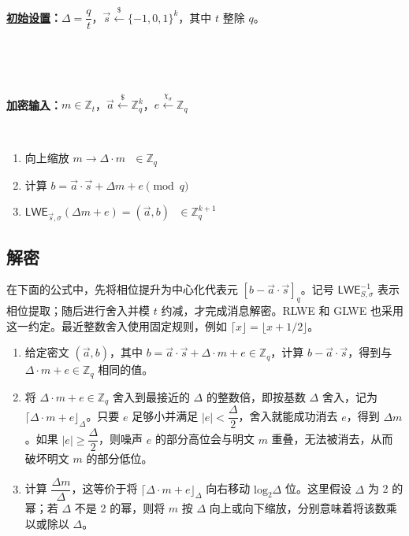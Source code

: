 \begin{tcolorbox}[title={\textbf{\tboxlabel{\ref*{subsec:lwe-enc}} LWE 加密}}]
\textbf{\underline{初始设置}：}$\Delta = \dfrac{q}{t}$，$\vec{s} \xleftarrow{\$} \{-1, 0, 1\}^k$，其中 $t$ 整除 $q$。

$ $

$ $

\textbf{\underline{加密输入}：}$m \in \mathbb{Z}_t$，$\vec{a} \xleftarrow{\$} \mathbb{Z}_q^k$，$e \xleftarrow{\chi_\sigma} \mathbb{Z}_q$

$ $


\begin{enumerate}
\item 向上缩放 $m \longrightarrow \Delta \cdot m \text{ } \in \mathbb{Z}_q$

\item 计算 $b = \vec{a} \cdot \vec{s} + \Delta  m + e \pmod q$
\item $\textsf{LWE}_{\vec{s},\sigma}(\Delta  m + e) = (\vec{a}, b) \text{ } \in \mathbb{Z}_q^{k + 1}$ 
\end{enumerate}

\end{tcolorbox}

\subsection{解密}
\label{subsec:lwe-dec}

在下面的公式中，先将相位提升为中心化代表元 $[b-\vec a\cdot\vec s]_q$。记号 $\textsf{LWE}^{-1}_{S,\sigma}$ 表示相位提取；随后进行舍入并模 $t$ 约减，才完成消息解密。RLWE 和 GLWE 也采用这一约定。最近整数舍入使用固定规则，例如 $\lceil x\rfloor=\lfloor x+1/2\rfloor$。

\begin{enumerate}
\item 给定密文 $(\vec{a}, b)$，其中 $b = \vec{a} \cdot \vec{s} + \Delta \cdot m + e \in \mathbb{Z}_q$，计算 $b - \vec{a} \cdot \vec{s}$，得到与 $\Delta \cdot m + e \in \mathbb{Z}_q$ 相同的值。
\item 将 $\Delta \cdot m + e \in \mathbb{Z}_q$ 舍入到最接近的 $\Delta$ 的整数倍，即按基数 $\Delta$ 舍入，记为 $\lceil \Delta \cdot m + e \rfloor_{\Delta}$。只要 $e$ 足够小并满足 $|e| < \dfrac{\Delta}{2}$，舍入就能成功消去 $e$，得到 $\Delta m$。如果 $|e| \geq \dfrac{\Delta}{2}$，则噪声 $e$ 的部分高位会与明文 $m$ 重叠，无法被消去，从而破坏明文 $m$ 的部分低位。
\item 计算 $\dfrac{\Delta m} {\Delta}$，这等价于将 $\lceil \Delta \cdot m + e \rfloor_{\Delta}$ 向右移动 $\text{log}_2 \Delta$ 位。这里假设 $\Delta$ 为 2 的幂；若 $\Delta$ 不是 2 的幂，则将 $m$ 按 $\Delta$ 向上或向下缩放，分别意味着将该数乘以或除以 $\Delta$。
\end{enumerate}

